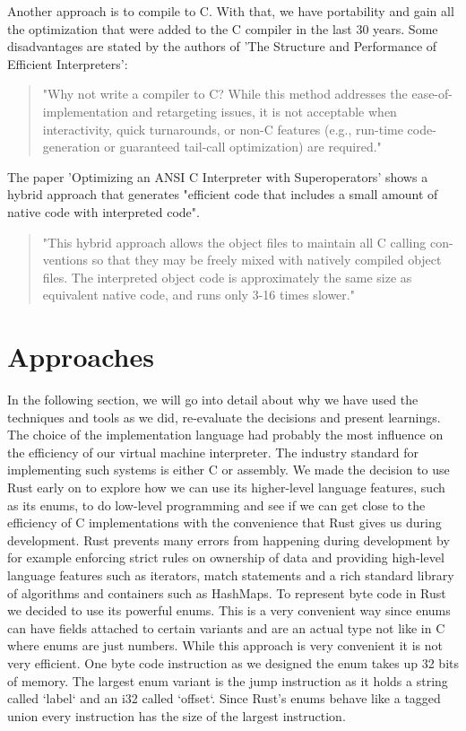 \documentclass{article}
\begin{document}
Another approach is to compile to C. With that, we have portability and gain
all the optimization that were added to the C compiler in the last 30 years.
Some disadvantages are stated by the authors of 'The Structure and Performance
of Efficient Interpreters':

\begin{quotation} 
"Why not write a compiler to C? While this method addresses the
ease-of-implementation and retargeting issues, it is not acceptable when
interactivity, quick turnarounds, or non-C features (e.g., run-time
code-generation or guaranteed tail-call optimization) are required."
~\cite{structure_and_performance}
\end{quotation} 
The paper 'Optimizing an ANSI C Interpreter with Superoperators' shows a hybrid
approach that generates "efficient code that includes a small amount of native
code with interpreted code". ~\cite{superoperators}

\begin{quotation}
"This hybrid approach allows the object files to maintain all C calling con-
ventions so that they may be freely mixed with natively compiled object
files. The interpreted object code is approximately the same size as
equivalent native code, and runs only 3-16 times slower." ~\cite{superoperators}
\end{quotation}

\section{Approaches}
In the following section, we will go into detail about why we have used the 
techniques and tools as we did, re-evaluate the decisions and present 
learnings.
The choice of the implementation language had probably the most influence on
the efficiency of our virtual machine interpreter. The industry standard for
implementing such systems is either C or assembly. We made the decision to use
Rust early on to explore how we can use its higher-level language features,
such as its enums, to do low-level programming and see if we can get close to
the efficiency of C implementations with the convenience that Rust gives us
during development. Rust prevents many errors from happening during development
by for example enforcing strict rules on ownership of data and providing
high-level language features such as iterators, match statements and a rich
standard library of algorithms and containers such as HashMaps. To represent
byte code in Rust we decided to use its powerful enums. This is a very
convenient way since enums can have fields attached to certain variants and are
an actual type not like in C where enums are just numbers. While this approach
is very convenient it is not very efficient. One byte code instruction as we
designed the enum takes up 32 bits of memory. The largest enum variant is the
jump instruction as it holds a string called `label` and an i32 called
`offset`. Since Rust's enums behave like a tagged union every instruction has
the size of the largest instruction.
\end{document}
